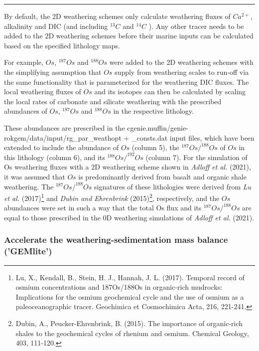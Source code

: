 \vspace{1mm}
\noindent\rule{4cm}{0.5pt}
\vspace{2mm}

\noindent By default, the 2D weathering schemes only calculate weathering fluxes of \(Ca^{2+}\), alkalinity and DIC (and including \(^{13}C\) and \(^{14}C\) ). Any other tracer needs to be added to the 2D weathering schemes before their marine inputs can be calculated based on the specified lithology maps.

For example, \(Os\), \(^{187}Os\) and \(^{188}Os\) were added to the 2D weathering schemes with the simplifying assumption that \(Os\) supply from weathering scales to run-off via the same functionality that is parameterized for the weathering DIC fluxes. The local weathering fluxes of \(Os\) and its isotopes can then be calculated by scaling the local rates of carbonate and silicate weathering with the prescribed abundances of \(Os\), \(^{187}Os\) and \(^{188}Os\) in the respective lithology.

These abundances are prescribed in the \textsf{\footnotesize cgenie.muffin/genie-rokgem/data/input/rg\_par\_weathopt} + \textsf{\footnotesize \_consts.dat} input files, which have been extended to include the abundance of \(Os\) (column 5), the \(^{187}Os/^{188}Os\) of \(Os\) in this lithology (column 6), and its \(^{188}Os/^{192}Os\) (column 7). For the simulation of Os weathering fluxes with a 2D weathering scheme shown in \textit{Adloff et al.} (2021), it was assumed that \(Os\) is predominantly derived from basalt and organic shale weathering. The \(^{187}Os/^{188}Os\) signatures of these lithologies were derived from \textit{Lu et al.} (2017)\footnote{Lu, X., Kendall, B., Stein, H. J., Hannah, J. L. (2017). Temporal record of osmium concentrations and 187Os/188Os in organic-rich mudrocks: Implications for the osmium geochemical cycle and the use of osmium as a paleoceanographic tracer. Geochimica et Cosmochimica Acta, 216, 221-241.} and \textit{Dubin and Ehrenbrink} (2015)\footnote{Dubin, A., Peucker-Ehrenbrink, B. (2015). The importance of organic-rich shales to the geochemical cycles of rhenium and osmium. Chemical Geology, 403, 111-120.}, respectively, and the \(Os\) abundances were set in such a  way that the total Os flux and its \(^{187}Os/^{188}Os\) are equal to those prescribed in the 0D weathering simulations of \textit{Adloff et al.} (2021).

%
\newpage
\subsubsection{Accelerate the weathering-sedimentation mass balance ('GEMlite')}\label{subsec:accelerate_the_weathering-sedimentation_mass_balance}
\vspace{1mm}

